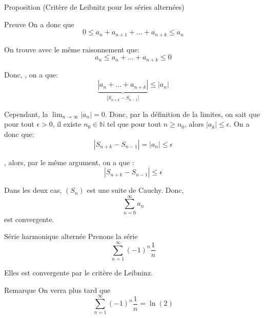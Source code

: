 \documentclass[a4paper]{article}
\begin{document}
\begin{parag}{Proposition (Critère de Leibnitz pour les séries alternées)}
\begin{subparag}{Preuve}
        On a donc que
        \[0 \leq a_n + a_{n+1} + \ldots + a_{n+k} \leq a_n\]

         On trouve avec le même raisonnement que:
        \[a_n \leq a_n + \ldots + a_{n+k} \leq 0\]

        Donc, , on a que:
        \[\underbrace{\left|a_n + \ldots + a_{n+k}\right|}_{\left|S_{n+k} - S_{n-1}\right|} \leq \left|a_n\right|\]

        Cependant, la $\lim_{n \to \infty} \left|a_n\right| = 0$. Donc, par la définition de la limites, on sait que pour tout $\epsilon > 0$, il existe $n_0 \in \mathbb{N}$ tel que pour tout $n \geq n_0$, alors $\left|a_k\right| \leq \epsilon$. On a donc que:
        \[\left|S_{n + k} - S_{n-1}\right| = \left|a_n\right| \leq \epsilon\]


        , alors, par le même argument, on a que :
        \[\left|S_{n+k} - S_{n-1}\right| \leq \epsilon\]

        Dans les deux cas, $\left(S_n\right)$ est une suite de Cauchy. Donc,
        \[\sum_{n=0}^{\infty} a_n\]
        est convergente.


    \end{subparag}

\end{parag}

\begin{parag}{Série harmonique alternée}
    Prenons la série
    \[\sum_{n = 1}^{\infty} \left(-1\right)^{n} \frac{1}{n}\]

    Elles est convergente par le critère de Leibninz.

    \begin{subparag}{Remarque}
        On verra plus tard que
        \[\sum_{n = 1}^{\infty} \left(-1\right)^{n} \frac{1}{n} = \ln\left(2\right)\]
    \end{subparag}
\end{parag}
\end{document}
